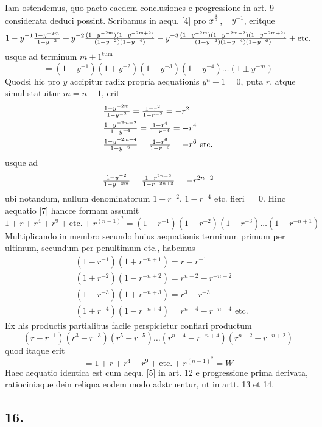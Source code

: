 \documentclass[twoside,12pt, showframe]{memoir}
\let\oldfrac\frac
\def\frac#1#2{\mathchoice{\tfrac{#1}{#2}}{\oldfrac{#1}{#2}}{\genfrac{}{}{}{2}{#1}{#2\mathstrut}}{\genfrac{}{}{}{3}{#1}{#2\mathstrut}}}
\begin{document}
Iam ostendemus, quo pacto eaedem conclusiones e progressione in art. 9 considerata deduci possint. Scribamus in aequ. [4] pro \(x^{\frac{1}{2}}\), \(-y^{-1}\), eritque\clearpage\noindent%
\[1-y^{-1} \frac{1-y^{-2 m}}{1-y^{-2}}+y^{-2} \frac{(1-y^{-2 m})(1-y^{-2 m+2})}{(1-y^{-2})(1-y^{-4})}-y^{-3} \frac{(1-y^{-2 m})(1-y^{-2 m+2})(1-y^{-2 m+2})}{(1-y^{-2})(1-y^{-4})(1-y^{-6})}+\text{etc.}\]
usque ad terminum \(m+1^{\text{tum }}\)
\[=(1-y^{-1})(1+y^{-2})(1-y^{-3})(1+y^{-4}) \ldots(1 \pm y^{-m})\tag{7}\]
Quodsi hic pro \(y\) accipitur radix propria aequationis \(y^{n}-1=0\), puta \(r\), atque simul statuitur \(m=n-1\), erit
\[\begin{aligned}
& \frac{1-y^{-2 m}}{1-y^{-2}}=\frac{1-r^{2}}{1-r^{-2}}=-r^{2} \\
& \frac{1-y^{-2 m+2}}{1-y^{-4}}=\frac{1-r^{4}}{1-r^{-4}}=-r^{4} \\
& \frac{1-y^{-2 m+4}}{1-y^{-6}}=\frac{1-r^{6}}{1-r^{-6}}=-r^{6} \text{ etc.}
\end{aligned}\]
usque ad
\[\frac{1-y^{-2}}{1-y^{-2 m}}=\frac{1-r^{2 n-2}}{1-r^{-2 n+2}}=-r^{2 n-2}\]
ubi notandum, nullum denominatorum \(1-r^{-2}\), \(1-r^{-4}\) etc. fieri \(=0\). Hinc aequatio [7] hancce formam assumit
\[1+r+r^{4}+r^{9}+\text{etc.}+r^{(n-1)^{2}}=(1-r^{-1})(1+r^{-2})(1-r^{-3}) \ldots(1+r^{-n+1})\]
Multiplicando in membro secundo huius aequationis terminum primum per ultimum, secundum per penultimum etc., habemus
\[\begin{aligned}
& (1-r^{-1})(1+r^{-n+1})=r-r^{-1} \\
& (1+r^{-2})(1-r^{-n+2})=r^{n-2}-r^{-n+2} \\
& (1-r^{-3})(1+r^{-n+3})=r^{3}-r^{-3} \\
& (1+r^{-4})(1-r^{-n+4})=r^{n-4}-r^{-n+4} \text{ etc.}
\end{aligned}\]
Ex his productis partialibus facile perspicietur conflari productum
\[(r-r^{-1})(r^{3}-r^{-3})(r^{5}-r^{-5}) \ldots(r^{n-4}-r^{-n+4})(r^{n-2}-r^{-n+2})\]
quod itaque erit
\[=1+r+r^{4}+r^{9}+\text{etc.}+r^{(n-1)^{2}}=W\]
Haec aequatio identica est cum aequ. [5] in art. 12 e progressione prima derivata, ratiociniaque dein reliqua eodem modo adstruentur, ut in artt. 13 et 14.\clearpage\noindent%

\subsection*{16.}
 
\end{document}
